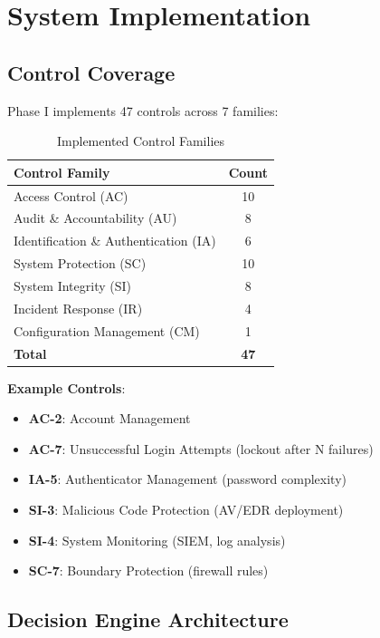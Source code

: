 \documentclass[11pt,conference]{IEEEtran}
\begin{document}
\section{System Implementation}

\subsection{Control Coverage}

Phase I implements 47 controls across 7 families:

\begin{table}[h]
\centering
\caption{Implemented Control Families}
\begin{tabular}{lc}
\toprule
\textbf{Control Family} & \textbf{Count} \\
\midrule
Access Control (AC) & 10 \\
Audit \& Accountability (AU) & 8 \\
Identification \& Authentication (IA) & 6 \\
System Protection (SC) & 10 \\
System Integrity (SI) & 8 \\
Incident Response (IR) & 4 \\
Configuration Management (CM) & 1 \\
\midrule
\textbf{Total} & \textbf{47} \\
\bottomrule
\end{tabular}
\end{table}

\textbf{Example Controls}:
\begin{itemize}
    \item \textbf{AC-2}: Account Management
    \item \textbf{AC-7}: Unsuccessful Login Attempts (lockout after N failures)
    \item \textbf{IA-5}: Authenticator Management (password complexity)
    \item \textbf{SI-3}: Malicious Code Protection (AV/EDR deployment)
    \item \textbf{SI-4}: System Monitoring (SIEM, log analysis)
    \item \textbf{SC-7}: Boundary Protection (firewall rules)
\end{itemize}

\subsection{Decision Engine Architecture}
\end{document}
